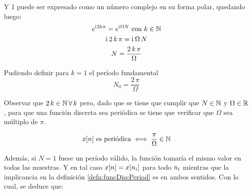 Y 1 puede ser expresado como un número complejo en su forma polar, quedando luego:
\begin{gather*}
    e^{\mathrm{i}\mkern1mu 2 k \pi} = e^{\mathrm{i}\mkern1mu \Omega N} \text{ con $k \in \mathbb{N}$}
    \\
    \mathrm{i}\mkern1mu \, 2 \, k \, \pi = \mathrm{i}\mkern1mu \, \Omega \, N
    \\
    N = \frac{2 \, k \, \pi}{\Omega}
\end{gather*}

Pudiendo definir para $k=1$ el período fundamental
\begin{equation*}
    N_0 = \frac{2 \, \pi}{\Omega}
\end{equation*}

Observar que $2 \, k \in \mathbb{N} \, \forall \, k$ pero, dado que se tiene que cumplir que $N \in \mathbb{N}$ y $\Omega \in \mathbb{R}$, para que una función discreta sea periódica se tiene que verificar que $\Omega$ sea múltiplo de $\pi$.

\begin{mdframed}[style=MyFrame1]
    \begin{prop}
    \end{prop}
    \begin{equation*}
        x[n] \text{ es periódica} \iff \frac{\pi}{\Omega} \in \mathbb{N}
    \end{equation*}
\end{mdframed}

Además, si $N=1$ fuese un período válido, la función tomaría el mismo valor en todas las muestras.
Y en tal caso $x[n] = x[n_i]$ para todo $n_i$ mientras que la implicancia en la definición \ref{defn:funcDiscPeriod} es en ambos sentidos.
Con lo cual, se deduce que:

\begin{mdframed}[style=MyFrame1]
    \begin{prop}
    \end{prop}
\end{mdframed}